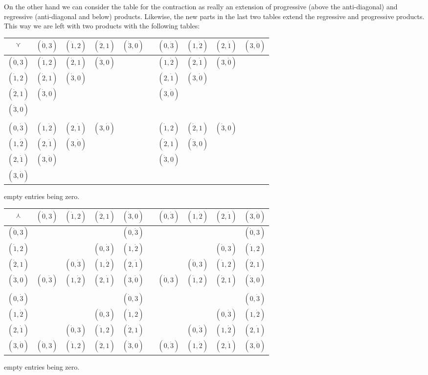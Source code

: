 \documentclass[\ifafour a4paper,12pt,\else a5paper,10pt,\fi%
onecolumn,oneside,article,%
british%
]{memoir}
\theoremstyle{remark}
\theoremstyle{innote}
\renewcommand*{\|}{\nonscript\,\vert\nonscript\;\mathopen{}}
\newcommand*{\ve}{\curlyvee}
\newcommand*{\we}{\curlywedge}
\newcommand*{\+}{\boxplus}
\newcommand*{\ywp}{\dot{0}}
\newcommand*{\ywl}{\dot{1}}
\newcommand*{\ywa}{\dot{2}}
\newcommand*{\ywv}{\dot{3}}
\begin{document}
On the other hand we can consider the table for the contraction as really
an extension of progressive (above the anti-diagonal) and regressive
(anti-diagonal and below) products. Likewise, the new parts in the last two
tables extend the regressive and progressive products. This way we are left
with two products with the following tables:

\bigskip

{\centering
  \begin{tabular}{c|ccccccccc}
    $\ve$& $(\ywp,3)$&$(\ywl,2)$&$(\ywa,1)$&$(\ywv,0)$  &
 &$(0,\ywv)$&$(1,\ywa)$&$(2,\ywl)$&$(3,\ywp)$ \\
    \midrule
    $(\ywp,3)$&$(\ywl,2)$&$(\ywa,1)$&$(\ywv,0)$&&
 &$(1,\ywa)$&$(2,\ywl)$&$(3,\ywp)$& \\
    $(\ywl,2)$&$(\ywa,1)$&$(\ywv,0)$&&&
 &$(2,\ywl)$&$(3,\ywp)$&& \\
    $(\ywa,1)$&$(\ywv,0)$&&&&
 &$(3,\ywp)$&&& \\
    $(\ywv,0)$&&&&&
 &&&& \\
 &&&&&&&&& \\
    $(0,\ywv)$ &$(1,\ywa)$&$(2,\ywl)$&$(3,\ywp)$&&
 &$(\ywl,2)$&$(\ywa,1)$&$(\ywv,0)$& \\                                         
    $(1,\ywa)$ &$(2,\ywl)$&$(3,\ywp)$&&&
 &$(\ywa,1)$&$(\ywv,0)$&& \\                    
    $(2,\ywl)$&$(3,\ywp)$&&&&
 &$(\ywv,0)$&&& \\
 $(3,\ywp)$&&&&&&&&& 
  \end{tabular}

}
empty entries being zero.

\bigskip

{\centering
  \begin{tabular}{c|ccccccccc}
    $\we$& $(\ywp,3)$&$(\ywl,2)$&$(\ywa,1)$&$(\ywv,0)$  &
 &$(0,\ywv)$&$(1,\ywa)$&$(2,\ywl)$&$(3,\ywp)$ \\
    \midrule
    $(\ywp,3)$&&&&$(0,\ywv)$ &
     &&&&$(\ywp,3)$ \\
    $(\ywl,2)$&&&$(0,\ywv)$&$(1,\ywa)$ &
&&&$(\ywp,3)$&$(\ywl,2)$ \\
    $(\ywa,1)$&&$(0,\ywv)$&$(1,\ywa)$&$(2,\ywl)$ &
&&$(\ywp,3)$&$(\ywl,2)$&$(\ywa,1)$ \\
    $(\ywv,0)$&$(0,\ywv)$&$(1,\ywa)$&$(2,\ywl)$&$(3,\ywp)$ &
 &$(\ywp,3)$&$(\ywl,2)$&$(\ywa,1)$&$(\ywv,0)$ \\
 &&&&&&&&& \\
    $(0,\ywv)$&&&&$(\ywp,3)$ &
&&&&$(0,\ywv)$ \\                               
$(1,\ywa)$&&&$(\ywp,3)$&$(\ywl,2)$ &
&&&$(0,\ywv)$&$(1,\ywa)$ \\
 $(2,\ywl)$&&$(\ywp,3)$&$(\ywl,2)$&$(\ywa,1)$ &
 &&$(0,\ywv)$&$(1,\ywa)$&$(2,\ywl)$ \\
 $(3,\ywp)$&$(\ywp,3)$&$(\ywl,2)$&$(\ywa,1)$&$(\ywv,0)$ &
 &$(0,\ywv)$&$(1,\ywa)$&$(2,\ywl)$&$(3,\ywp)$
  \end{tabular}

}
empty entries being zero.
\end{document}
